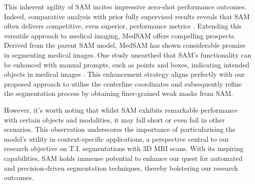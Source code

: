 This inherent agility of SAM incites impressive zero-shot performance outcomes. Indeed, comparative analysis with prior fully supervised results reveals that SAM often delivers competitive, even superior, performance metrics \cite{kirillov2023segany}. Extending this versatile approach to medical imaging, MedSAM \cite{MedSAM} offers compelling prospects. Derived from the parent SAM model, MedSAM has shown considerable promise in segmenting medical images. One study unearthed that SAM's functionality can be enhanced with manual prompts, such as points and boxes, indicating intended objects in medical images \cite{huang2023segment}. This enhancement strategy aligns perfectly with our proposed approach to utilise the centerline coordinates and subsequently refine the segmentation process by obtaining finer-grained weak masks from SAM.

However, it's worth noting that whilst SAM exhibits remarkable performance with certain objects and modalities, it may fall short or even fail in other scenarios. This observation underscores the importance of particularising the model's utility in context-specific applications, a perspective central to our research objective on T.I. segmentations with 3D MRI scans. With its inspiring capabilities, SAM holds immense potential to enhance our quest for automated and precision-driven segmentation techniques, thereby bolstering our research outcomes.












